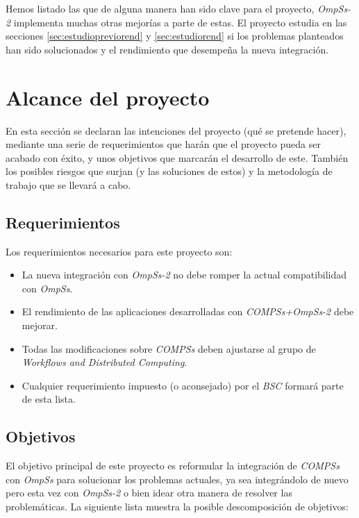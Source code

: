 Hemos listado las que de alguna manera han sido clave para el proyecto, \textit{OmpSs-2} implementa muchas otras mejorías a parte de estas\cite{OmpSs2reference}. El proyecto estudia en las secciones \ref{sec:estudiopreviorend} y \ref{sec:estudiorend} si los problemas planteados han sido solucionados y el rendimiento que desempeña la nueva integración.

\section{Alcance del proyecto}

En esta sección se declaran las intenciones del proyecto (qué se pretende hacer), mediante una serie de requerimientos que harán que el proyecto pueda ser acabado con éxito, y unos objetivos que marcarán el desarrollo de este. También los posibles riesgos que surjan (y las soluciones de estos) y la metodología de trabajo que se llevará a cabo.

\subsection{Requerimientos}

 Los requerimientos necesarios para este proyecto son:

\begin{itemize}
 \item La nueva integración con \textit{OmpSs-2} no debe romper la actual compatibilidad con \textit{OmpSs}.
 \item El rendimiento de las aplicaciones desarrolladas con \textit{COMPSs+OmpSs-2} debe mejorar.
 \item Todas las modificaciones sobre \textit{COMPSs} deben ajustarse al grupo de \textit{Workflows and Distributed Computing}.
 \item Cualquier requerimiento impuesto (o aconsejado) por el \textit{BSC} formará parte de esta lista.
  
\end{itemize}

\subsection{Objetivos}

El objetivo principal de este proyecto es reformular la integración de \textit{COMPSs} con \textit{OmpSs} para solucionar los problemas actuales, ya sea integrándolo de nuevo pero esta vez con \textit{OmpSs-2} o bien idear otra manera de resolver las problemáticas. La siguiente lista muestra la posible descomposición de objetivos:

